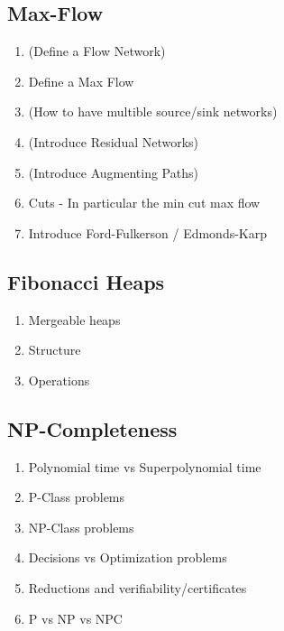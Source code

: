 \subsection{Max-Flow}
\begin{enumerate}
  \item (Define a Flow Network)
  \item Define a Max Flow
  \item (How to have multible source/sink networks)
  \item (Introduce Residual Networks)
  \item (Introduce Augmenting Paths)
  \item Cuts - In particular the min cut max flow
  \item Introduce Ford-Fulkerson / Edmonds-Karp
\end{enumerate}
\newpage

\subsection{Fibonacci Heaps}
\begin{enumerate}
  \item Mergeable heaps
  \item Structure
  \item Operations
\end{enumerate}
\newpage

\subsection{NP-Completeness}
\begin{enumerate}
  \item Polynomial time vs Superpolynomial time
  \item P-Class problems
  \item NP-Class problems
  \item Decisions vs Optimization problems
  \item Reductions and verifiability/certificates
  \item P vs NP vs NPC
\end{enumerate}
\newpage

